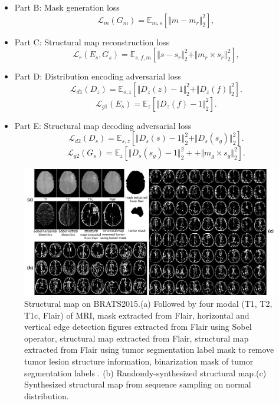 \documentclass[runningheads]{llncs}
\begin{document}
	\begin{itemize}
		\item{Part B: Mask generation loss}
		\begin{equation}
		\mathcal{L}_{m}(G_m)=\mathbb{E}_{m,s}[\Vert{m-m_r}\Vert_{2}^{2}],
		\end{equation}
		\item{Part C: Structural map reconstruction loss} 
		\begin{equation}
		\mathcal{L}_{r}(E_s,G_s)=\mathbb{E}_{s,f,m}[\Vert{s-s_r}\Vert_{2}^{2}+\Vert{m_r\times s_r}\Vert_{2}^{2}],
		\end{equation}
		\item{Part D: Distribution encoding adversarial loss} 
		\begin{equation}
		\mathcal{L}_{d1}(D_{z})=\mathbb{E}_{s,z}[\Vert{D_{z}(z)-1}\Vert_{2}^{2}+\Vert{D_{z}(f)}\Vert_{2}^{2}].
		\end{equation}
		\begin{equation}
		\mathcal{L}_{g1}(E_s)=\mathbb{E}_{z}[\Vert{D_{z}(f)-1}\Vert_{2}^{2}].	
		\end{equation}
		\item{Part E: Structural map decoding adversarial loss} 
		\begin{equation}
		\mathcal{L}_{d2}(D_{s})=\mathbb{E}_{s,z}[\Vert{D_{s}(s)-1}\Vert_{2}^{2}+\Vert{D_{s}(s_g)}\Vert_{2}^{2}].
		\end{equation}
		\begin{equation}
		\mathcal{L}_{g2}(G_s)=\mathbb{E}_{z}[\Vert{D_{s}(s_g)-1}\Vert_{2}^{2}++\Vert{m_g\times s_g}\Vert_{2}^{2}].	
		\end{equation}
	\end{itemize}
	\begin{figure}[thbp!]
		\centering
		\includegraphics[width=0.85\linewidth]{figures/brats_f}
		\caption{Structural map on BRATS2015.(a) Followed by four modal (T1, T2, T1c, Flair) of MRI, mask extracted from Flair, horizontal and vertical edge detection figures extracted from Flair using Sobel operator, structural map extracted from Flair, structural map extracted from Flair using tumor segmentation label mask to remove tumor lesion structure information, binarization mask of tumor segmentation labels .
			(b) Randomly-synthesized structural map.(c) Synthesized structural map from sequence sampling on normal distribution.}
		\label{generated_f}
	\end{figure}
\end{document}
